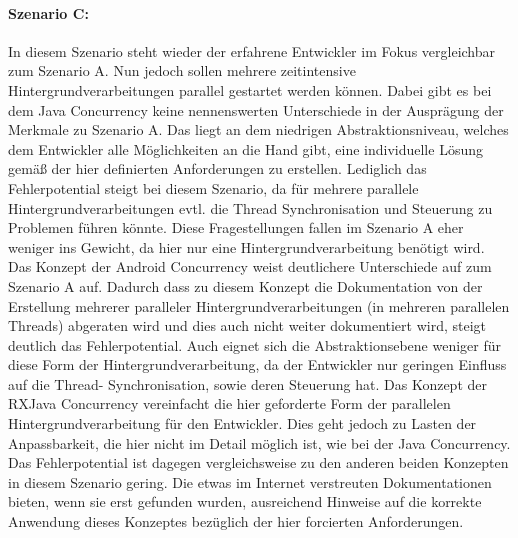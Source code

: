 \documentclass[12pt,oneside,a4paper,bibtotoc,liststotoc]{scrreprt}
\begin{document}
\paragraph{Szenario C:}
In diesem Szenario steht wieder der erfahrene Entwickler im Fokus vergleichbar zum Szenario A. Nun jedoch sollen mehrere zeitintensive Hintergrundverarbeitungen parallel gestartet werden können. Dabei gibt es bei dem Java Concurrency keine nennenswerten Unterschiede in der Ausprägung der Merkmale zu Szenario A. Das liegt an dem niedrigen Abstraktionsniveau, welches dem Entwickler alle Möglichkeiten an die Hand gibt, eine individuelle Lösung gemäß der hier definierten Anforderungen zu erstellen. Lediglich das Fehlerpotential steigt bei diesem Szenario, da für mehrere parallele Hintergrundverarbeitungen evtl. die Thread Synchronisation und Steuerung zu Problemen führen könnte. Diese Fragestellungen fallen im Szenario A eher weniger ins Gewicht, da hier nur eine Hintergrundverarbeitung benötigt wird.
Das Konzept der Android Concurrency weist deutlichere Unterschiede auf zum Szenario A auf. Dadurch dass zu diesem Konzept die Dokumentation von der Erstellung mehrerer paralleler Hintergrundverarbeitungen (in mehreren parallelen Threads) abgeraten wird und dies auch nicht weiter dokumentiert wird, steigt deutlich das Fehlerpotential. Auch eignet sich die Abstraktionsebene weniger für diese Form der Hintergrundverarbeitung, da der Entwickler nur geringen Einfluss auf die Thread- Synchronisation, sowie deren Steuerung hat.
Das Konzept der RXJava Concurrency vereinfacht die hier geforderte Form der parallelen Hintergrundverarbeitung für den Entwickler. Dies geht jedoch zu Lasten der Anpassbarkeit, die hier nicht im Detail möglich ist, wie bei der Java Concurrency. Das Fehlerpotential ist dagegen vergleichsweise zu den anderen beiden Konzepten in diesem Szenario gering. Die etwas im Internet verstreuten Dokumentationen bieten, wenn sie erst gefunden wurden, ausreichend Hinweise auf die korrekte Anwendung dieses Konzeptes bezüglich der hier forcierten Anforderungen.\newline
\end{document}
